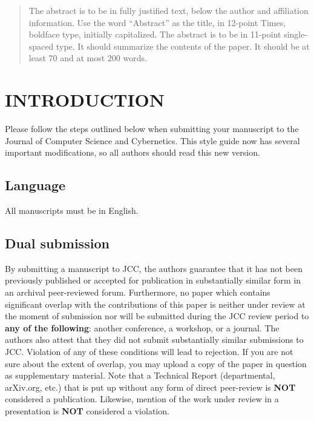 {\cn

\begin{abstract}
The abstract is to be in fully justified text, below the author and affiliation information. Use the word ``Abstract'' as the title, in 12-point Times, boldface type, initially capitalized. The abstract is to be in 11-point single-spaced type. It should summarize the contents of the paper. It should be at least 70 and at most 200 words. 
\end{abstract}


\section{INTRODUCTION}

Please follow the steps outlined below when submitting your manuscript to the Journal of Computer Science and Cybernetics. This style guide now has several important modifications, so all authors should read this new version.

\subsection{Language}

All manuscripts must be in English. 

\subsection{Dual submission}

By submitting a manuscript to JCC, the authors guarantee that it has not been previously published or accepted for publication in substantially similar form in an archival peer-reviewed forum. Furthermore, no paper which contains significant overlap with the contributions of this paper is neither under review at the moment of submission nor will be submitted during the JCC review period to {\bf any of the following}: another conference, a workshop, or a journal. The authors also attest that they did not submit substantially similar submissions to JCC. Violation of any of these conditions will lead to rejection. If you are not sure about the extent of overlap, you may upload a copy of the paper in question as supplementary material. Note that a Technical Report (departmental, arXiv.org, etc.) that is put up without any form of direct peer-review is {\bf NOT} considered a publication. Likewise, mention of the work under review in a presentation is {\bf NOT} considered a violation. 

}
